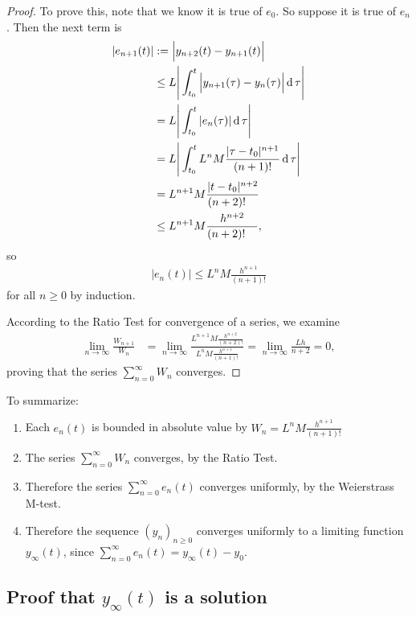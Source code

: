 \begin{proof}
To prove this, note that we know it is true of $e_0$. So suppose it is true of
$e_n$. Then the next term is
\begin{align*}
  |e_{n+1}(t)| & :=   \Big|y_{n+2}(t) - y_{n+1}(t)\Big|\\
              & \leq L\Bigg|\int_{t_0}^t \Big|y_{n+1}(\tau) - y_{n}(\tau)\Big| \operatorname{\text{d}}\tau\Bigg|\\
              &=     L\Bigg|\int_{t_0}^t |e_n(\tau)| \operatorname{\text{d}}\tau\Bigg|\\
              &=     L\Bigg|\int_{t_0}^t L^nM\frac{|\tau - t_0|^{n+1}}{(n+1)!} \operatorname{\text{d}}\tau\Bigg|\\
              &=     L^{n+1}M\frac{|t - t_0|^{n+2}}{(n+2)!^{~~~}}\\
              & \leq L^{n+1}M\frac{h^{n+2}}{(n+2)!^{~~~}},
\end{align*}
so
\begin{align*}
|e_n(t)| \leq L^nM\frac{h^{n+1}}{(n+1)!}
\end{align*}
for all $n \geq 0$ by induction.

According to the Ratio Test for convergence of a series, we examine
\begin{align*}
  \lim_{n\to \infty} \frac{W_{n+1}}{W_n}
  &= \lim_{n\to\infty} \frac{L^{n+1}M\frac{h^{n+2}}{(n+2)!}}
                          {L^nM\frac{h^{n+1}}{(n+1)!}}
   = \lim_{n\to\infty} \frac{Lh}{n+2}
    = 0,
\end{align*}
proving that the series $\sum_{n=0}^\infty W_n$ converges.
\end{proof}

To summarize:
\begin{enumerate}
\item Each $e_n(t)$ is bounded in absolute value by $W_n = L^nM\frac{h^{n+1}}{(n+1)!}$
\item The series $\sum_{n=0}^\infty W_n$ converges, by the Ratio Test.
\item Therefore the series $\sum_{n=0}^\infty e_n(t)$ converges uniformly, by
  the Weierstrass M-test.
\item Therefore the sequence $(y_n)_{n\geq 0}$ converges uniformly to a
  limiting function $y_\infty(t)$, since
  $\sum_{n=0}^\infty e_n(t) = y_\infty(t) - y_0$.
\end{enumerate}

\subsection{Proof that $y_\infty(t)$ is a solution}

